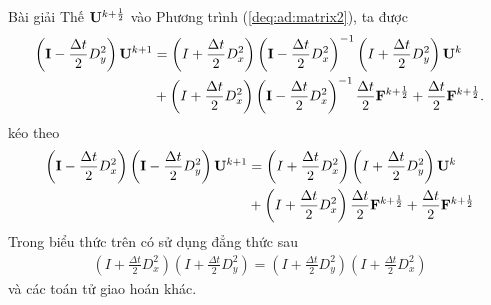 \documentclass[9pt]{beamer}
\numberwithin{equation}{section}
\begin{document}
\begin{frame}
\begin{exampleblock}{Bài giải}
    Thế ${\bf U}^{k+\frac{1}{2}}$ vào Phương trình (\ref{deq:ad:matrix2}), ta được
    \begin{align*}
        \left({\bf I} - \frac{\Delta t}{2} D_y^2\right) {\bf U}^{k+1} &=
        \left(I + \frac{\Delta t}{2} D_x^2\right) \left({\bf I} - \frac{\Delta t}{2} D_x^2\right)^{-1} \left(I + \frac{\Delta t}{2} D_y^2\right) {\bf U}^k \\ &+
        \left(I + \frac{\Delta t}{2} D_x^2\right) \left({\bf I} - \frac{\Delta t}{2} D_x^2\right)^{-1} \frac{\Delta t}{2} {\bf F}^{k+\frac{1}{2}} +
        \frac{\Delta t}{2} {\bf F}^{k+\frac{1 }{2}}. 
    \end{align*}
    kéo theo
    \begin{align}
        \left({\bf I} - \frac{\Delta t}{2} D_x^2\right) \left({\bf I} - \frac{\Delta t}{2} D_y^2\right) {\bf U}^{k+1} &=
        \left(I + \frac{\Delta t}{2} D_x^2\right) \left(I + \frac{\Delta t}{2} D_y^2\right) {\bf U}^k \nonumber \\ &+
        \left(I + \frac{\Delta t}{2} D_x^2\right) \frac{\Delta t}{2} {\bf F}^{k+\frac{1}{2}} + \frac{\Delta t}{2} {\bf F}^{k+\frac{1}{2}} \label{deq:adi:eq}
    \end{align}
    Trong biểu thức trên có sử dụng đẳng thức sau
    \begin{align*}
        \left(I + \frac{\Delta t}{2} D_x^2\right) \left(I + \frac{\Delta t}{2} D_y^2\right) =
        \left(I + \frac{\Delta t}{2} D_y^2\right) \left(I + \frac{\Delta t}{2} D_x^2\right)
    \end{align*}
    và các toán tử giao hoán khác.
\end{exampleblock}
\end{frame}
\end{document}

